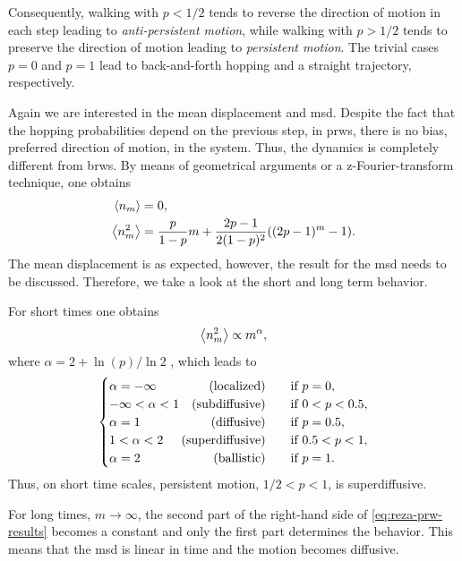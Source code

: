 Consequently, walking with $p < 1/2$ tends to reverse the direction of motion in each step leading to \textit{anti-persistent motion}, while walking with $p > 1/2$ tends to preserve the direction of motion leading to \textit{persistent motion}. The trivial cases $p=0$ and $p=1$ lead to back-and-forth hopping and a straight trajectory, respectively.

Again we are interested in the mean displacement and \ac{msd}. Despite the fact that the hopping probabilities depend on the previous step, in \acp{prw}, there is no bias, \ie preferred direction of motion, in the system. Thus, the dynamics is completely different from \acp{brw}. By means of geometrical arguments \cite{tierno:2016} or a z-Fourier-transform technique, one obtains \cite{shaebani:2014, hafner:2016}
\begin{equation}\label{eq:reza-prw-results}
 \begin{aligned}
  \left<n_m\right> &= 0,
  \\
  \left<n^2_m\right> &= \frac{p}{1-p}m+\frac{2p-1}{2(1-p)^2}((2p-1)^m-1).
 \end{aligned}
\end{equation}
The mean displacement is as expected, however, the result for the \ac{msd} needs to be discussed. Therefore, we take a look at the short and long term behavior.

For short times one obtains
\begin{equation*}
 \left<n^2_m\right> \propto m^\alpha,
\end{equation*}
where $\alpha = 2 + \ln{(p)} / \ln{2}$ \cite{shaebani:2014}, which leads to
\begin{equation*}
 \begin{cases}
  \alpha = -\infty \quad \hfill \textrm{(localized)} & \quad \textrm{if } p=0, \\
  -\infty < \alpha < 1 \quad \hfill \textrm{(subdiffusive)} & \quad \textrm{if } 0<p<0.5, \\
  \alpha = 1 \quad \hfill \textrm{(diffusive)} & \quad \textrm{if } p=0.5, \\
  1 < \alpha < 2 \quad \hfill \textrm{(superdiffusive)} & \quad \textrm{if } 0.5<p<1, \\
  \alpha = 2 \quad \hfill \textrm{(ballistic)} & \quad \textrm{if } p=1.
 \end{cases}
\end{equation*}
Thus, on short time scales, persistent motion, \ie $1/2 < p < 1$, is superdiffusive.

For long times, \ie $m \rightarrow \infty$, the second part of the right-hand side of \autoref{eq:reza-prw-results} becomes a constant and only the first part determines the behavior. This means that the \ac{msd} is linear in time and the motion becomes diffusive.

